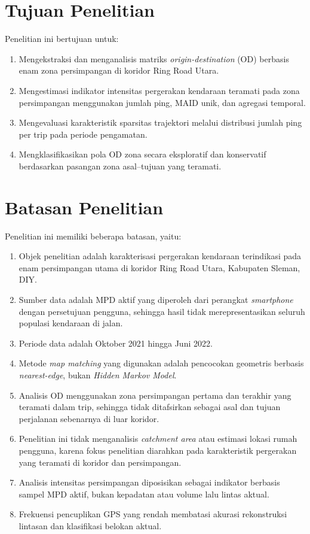 \section{Tujuan Penelitian}

Penelitian ini bertujuan untuk:
\begin{enumerate}
    \item Mengekstraksi dan menganalisis matriks \textit{origin-destination} (OD) berbasis enam zona persimpangan di koridor Ring Road Utara.
    \item Mengestimasi indikator intensitas pergerakan kendaraan teramati pada zona persimpangan menggunakan jumlah ping, MAID unik, dan agregasi temporal.
    \item Mengevaluasi karakteristik sparsitas trajektori melalui distribusi jumlah ping per trip pada periode pengamatan.
    \item Mengklasifikasikan pola OD zona secara eksploratif dan konservatif berdasarkan pasangan zona asal--tujuan yang teramati.
\end{enumerate}

\section{Batasan Penelitian}

Penelitian ini memiliki beberapa batasan, yaitu:
\begin{enumerate}
    \item Objek penelitian adalah karakterisasi pergerakan kendaraan terindikasi pada enam persimpangan utama di koridor Ring Road Utara, Kabupaten Sleman, DIY.
    \item Sumber data adalah MPD aktif yang diperoleh dari perangkat \textit{smartphone} dengan persetujuan pengguna, sehingga hasil tidak merepresentasikan seluruh populasi kendaraan di jalan.
    \item Periode data adalah Oktober 2021 hingga Juni 2022.
    \item Metode \textit{map matching} yang digunakan adalah pencocokan geometris berbasis \textit{nearest-edge}, bukan \textit{Hidden Markov Model}.
    \item Analisis OD menggunakan zona persimpangan pertama dan terakhir yang teramati dalam trip, sehingga tidak ditafsirkan sebagai asal dan tujuan perjalanan sebenarnya di luar koridor.
    \item Penelitian ini tidak menganalisis \textit{catchment area} atau estimasi lokasi rumah pengguna, karena fokus penelitian diarahkan pada karakteristik pergerakan yang teramati di koridor dan persimpangan.
    \item Analisis intensitas persimpangan diposisikan sebagai indikator berbasis sampel MPD aktif, bukan kepadatan atau volume lalu lintas aktual.
    \item Frekuensi pencuplikan GPS yang rendah membatasi akurasi rekonstruksi lintasan dan klasifikasi belokan aktual.
\end{enumerate}

